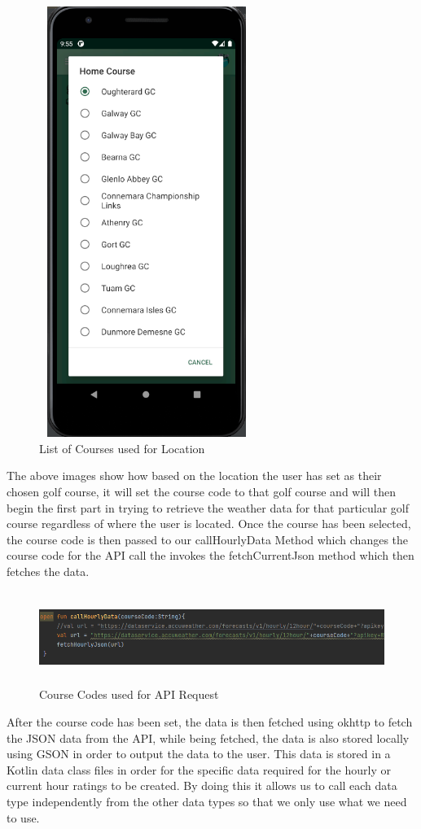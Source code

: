 \begin{figure}[H]
    \centering
    \includegraphics[width=7cm,height = 14cm]{img/InPhoneList.PNG}
    \caption{List of Courses used for Location}
    \label{fig:altas config}
\end{figure}
The above images show how based on the location the user has set as their chosen golf course, it will set the course code to that golf course and will then begin the first part in trying to retrieve the weather data for that particular golf course regardless of where the user is located.
\newline
Once the course has been selected, the course code is then passed to our callHourlyData Method which changes the course code for the API call the invokes the fetchCurrentJson method which then fetches the data.

\begin{figure}[H]
    \centering
    \includegraphics[width=16cm,height = 3cm]{img/APICall.PNG}
    \caption{Course Codes used for API Request}
    \label{fig:altas config}
\end{figure}
After the course code has been set, the data is then fetched using okhttp to fetch the JSON data from the API, while being fetched, the data is also stored locally using GSON in order to output the data to the user.
\newline
\newline
This data is stored in a Kotlin data class files in order for the specific data required for the hourly or current hour ratings to be created. By doing this it allows us to call each data type independently from the other data types so that we only use what we need to use.

